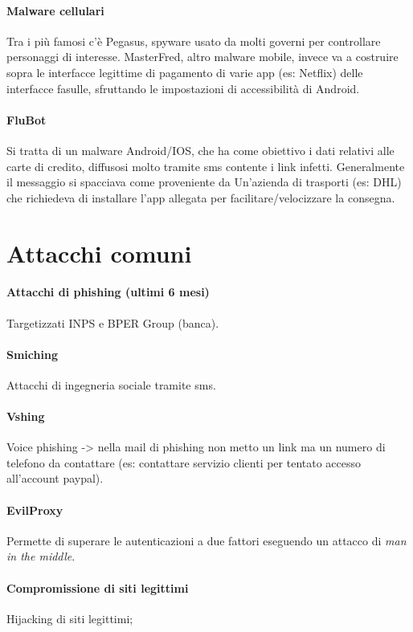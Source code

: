\paragraph{Malware cellulari} Tra i più famosi c'è Pegasus, spyware usato da molti governi per controllare personaggi di interesse. MasterFred, altro malware mobile, invece va a costruire sopra le interfacce legittime di pagamento di varie app (es: Netflix) delle interfacce fasulle, sfruttando le impostazioni di accessibilità di Android.
 
\paragraph{FluBot} Si tratta di un malware Android/IOS, che ha come obiettivo i dati relativi alle carte di credito, diffusosi molto tramite sms contente i link infetti. Generalmente il messaggio si spacciava come proveniente da Un'azienda di trasporti (es: DHL) che richiedeva di installare l'app allegata per facilitare/velocizzare la consegna.

\section{Attacchi comuni}
\paragraph{Attacchi di phishing (ultimi 6 mesi)} Targetizzati INPS e BPER Group (banca).

\paragraph{Smiching} Attacchi di ingegneria sociale tramite sms.

\paragraph{Vshing} Voice phishing -> nella mail di phishing non metto un link ma un numero di telefono da contattare (es: contattare servizio clienti per tentato accesso all'account paypal).

\paragraph{EvilProxy} Permette di superare le autenticazioni a due fattori eseguendo un attacco di \textit{man in the middle}.

\paragraph{Compromissione di siti legittimi} Hijacking di siti legittimi;

